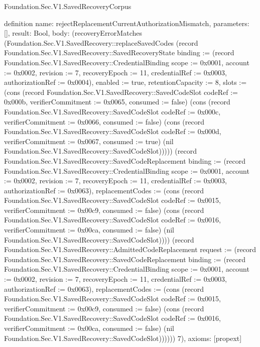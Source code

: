 \begin{lexlean}{Foundation.Sec.V1.SavedRecoveryCorpus}
\begin{semanticmodule}
definition{
  name: rejectReplacementCurrentAuthorizationMismatch,
  parameters: [],
  result: Bool,
  body: (recoveryErrorMatches (Foundation.Sec.V1.SavedRecovery::replaceSavedCodes (record Foundation.Sec.V1.SavedRecovery::SavedRecoveryState {binding := (record Foundation.Sec.V1.SavedRecovery::CredentialBinding {scope := 0x0001, account := 0x0002, revision := 7, recoveryEpoch := 11, credentialRef := 0x0003, authorizationRef := 0x0004}), enabled := true, retentionCapacity := 8, slots := (cons (record Foundation.Sec.V1.SavedRecovery::SavedCodeSlot {codeRef := 0x000b, verifierCommitment := 0x0065, consumed := false}) (cons (record Foundation.Sec.V1.SavedRecovery::SavedCodeSlot {codeRef := 0x000c, verifierCommitment := 0x0066, consumed := false}) (cons (record Foundation.Sec.V1.SavedRecovery::SavedCodeSlot {codeRef := 0x000d, verifierCommitment := 0x0067, consumed := true}) (nil Foundation.Sec.V1.SavedRecovery::SavedCodeSlot))))}) (record Foundation.Sec.V1.SavedRecovery::SavedCodeReplacement {binding := (record Foundation.Sec.V1.SavedRecovery::CredentialBinding {scope := 0x0001, account := 0x0002, revision := 7, recoveryEpoch := 11, credentialRef := 0x0003, authorizationRef := 0x0063}), replacementCodes := (cons (record Foundation.Sec.V1.SavedRecovery::SavedCodeSlot {codeRef := 0x0015, verifierCommitment := 0x00c9, consumed := false}) (cons (record Foundation.Sec.V1.SavedRecovery::SavedCodeSlot {codeRef := 0x0016, verifierCommitment := 0x00ca, consumed := false}) (nil Foundation.Sec.V1.SavedRecovery::SavedCodeSlot)))}) (record Foundation.Sec.V1.SavedRecovery::AdmittedCodeReplacement {request := (record Foundation.Sec.V1.SavedRecovery::SavedCodeReplacement {binding := (record Foundation.Sec.V1.SavedRecovery::CredentialBinding {scope := 0x0001, account := 0x0002, revision := 7, recoveryEpoch := 11, credentialRef := 0x0003, authorizationRef := 0x0063}), replacementCodes := (cons (record Foundation.Sec.V1.SavedRecovery::SavedCodeSlot {codeRef := 0x0015, verifierCommitment := 0x00c9, consumed := false}) (cons (record Foundation.Sec.V1.SavedRecovery::SavedCodeSlot {codeRef := 0x0016, verifierCommitment := 0x00ca, consumed := false}) (nil Foundation.Sec.V1.SavedRecovery::SavedCodeSlot)))})})) 7),
  axioms: [propext]
}


\end{semanticmodule}
\end{lexlean}
